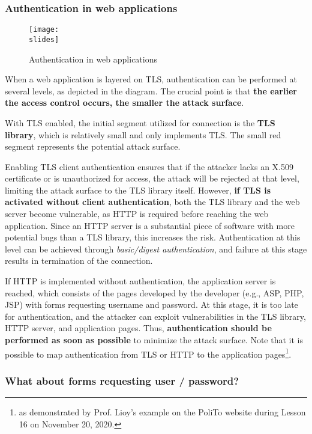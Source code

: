 \subsubsection{Authentication in web applications}
\begin{figure}[h]
    \centering
    \texttt{[image: \\slides]}
    \caption{Authentication in web applications}
\end{figure}

When a web application is layered on TLS, authentication can be performed at several levels, as depicted in the diagram. The crucial point is that \textbf{the earlier the access control occurs, the smaller the attack surface}.

With TLS enabled, the initial segment utilized for connection is the \textbf{TLS library}, which is relatively small and only implements TLS. The small red segment represents the potential attack surface.

Enabling TLS client authentication ensures that if the attacker lacks an X.509 certificate or is unauthorized for access, the attack will be rejected at that level, limiting the attack surface to the TLS library itself. However, \textbf{if TLS is activated without client authentication}, both the TLS library and the web server become vulnerable, as HTTP is required before reaching the web application. Since an HTTP server is a substantial piece of software with more potential bugs than a TLS library, this increases the risk. Authentication at this level can be achieved through \textit{basic/digest authentication}, and failure at this stage results in termination of the connection.

If HTTP is implemented without authentication, the application server is reached, which consists of the pages developed by the developer (e.g., ASP, PHP, JSP) with forms requesting username and password. At this stage, it is too late for authentication, and the attacker can exploit vulnerabilities in the TLS library, HTTP server, and application pages. Thus, \textbf{authentication should be performed as soon as possible} to minimize the attack surface. Note that it is possible to map authentication from TLS or HTTP to the application pages\footnote{as demonstrated by Prof. Lioy's example on the PoliTo website during Lesson 16 on November 20, 2020.}.



\subsubsection{What about forms requesting user / password?}

